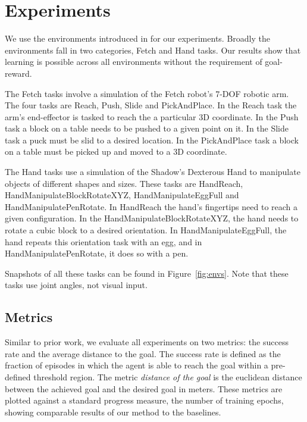 \section{Experiments}
\label{sec:experiments}
We use the environments introduced in \citet{plappert2018multi} for our experiments.
Broadly the environments fall in two categories, Fetch and Hand tasks.
Our results show that learning is possible across all environments
without the requirement of goal-reward.

The Fetch tasks involve a simulation of the Fetch robot's 7-DOF robotic arm. The four tasks are Reach, Push,
Slide and PickAndPlace.
In the Reach task the arm's end-effector is tasked to reach the a particular 3D coordinate. 
In the Push task a block on a table needs to be pushed to a given point on it.
In the Slide task a puck must be slid to a desired location.
In the PickAndPlace task a block on a table must be picked up and moved to a
3D coordinate.

The Hand tasks use a simulation of the Shadow's Dexterous Hand to manipulate objects of
different shapes and sizes. These tasks are HandReach,
HandManipulateBlockRotateXYZ, HandManipulateEggFull and HandManipulatePenRotate.
In HandReach the hand's fingertips need to reach a given configuration.
In the HandManipulateBlockRotateXYZ, the hand needs to rotate a cubic
block to a desired orientation.
In HandManipulateEggFull, the hand repeats this orientation task with an egg, and in
HandManipulatePenRotate, it does so with a pen.

Snapshots of all these tasks can be found in Figure~\ref{fig:envs}. Note that
these tasks use joint angles, not visual input.


\subsection{Metrics}
Similar to prior work, we evaluate all experiments on two metrics: the success
rate and the average distance to the goal. The success rate is defined as the
fraction of episodes in which the agent is able to reach the goal within a
pre-defined threshold region.
The metric \emph{distance of the goal} is the euclidean distance between
the achieved goal and the desired goal in meters.
These metrics are plotted against a standard progress measure, the
number of training epochs, showing
comparable results of our method to the baselines.

